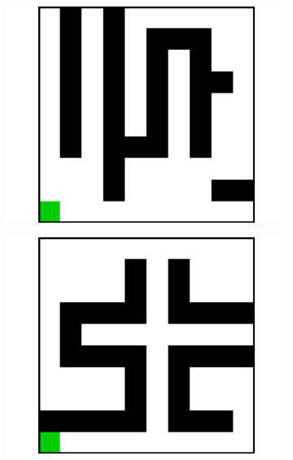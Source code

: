 \documentclass{article}
\begin{document}
\begin{figure}[t]
\begin{subfigure}[t]{0.18\textwidth}
    \includegraphics[width=\textwidth]{images/maze/maze12.pdf}
    \caption{}
  \end{subfigure}
  \begin{subfigure}[t]{0.18\textwidth}
    \includegraphics[width=\textwidth]{images/maze/maze13.pdf}
    \caption{}\label{fig:maze13}
  \end{subfigure}
  \begin{subfigure}[t]{0.18\textwidth}

\end{subfigure}
\end{figure}
\end{document}
